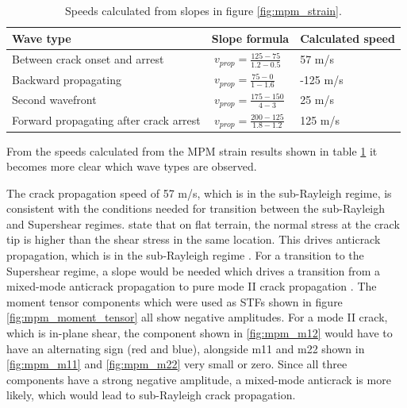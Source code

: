 \begin{table}[H]
\begin{tabular}{|l|l|l|}
\hline
Wave type                              & Slope formula                           & Calculated speed \\ \hline
Between crack onset and arrest         & $\ v_{prop} = \frac{125-75}{1.2-0.5} $  & 57 m/s           \\ \hline
Backward propagating                   & $\ v_{prop} = \frac{75-0}{1-1.6} $      & -125 m/s          \\ \hline
Second wavefront                       & $\ v_{prop} = \frac{175-150}{4-3} $     & 25 m/s           \\ \hline
Forward propagating after crack arrest & $\ v_{prop} = \frac{200-125}{1.8-1.2} $ & 125 m/s          \\ \hline
\end{tabular}
\caption{Speeds calculated from slopes in figure \ref{fig:mpm_strain}.}
\label{tab:mpm_results_speeds}
\end{table}

From the speeds calculated from the MPM strain results shown in table \ref{tab:mpm_results_speeds} it becomes more clear which wave types are observed. \par

The crack propagation speed of 57 m/s, which is in the sub-Rayleigh regime, is consistent with the conditions needed for transition between the sub-Rayleigh and Supershear regimes. \cite{trottetTransitionSubRayleighAnticrack2022} state that on flat terrain, the normal stress at the crack tip is higher than the shear stress in the same location. This drives anticrack propagation, which is in the sub-Rayleigh regime \parencite{gaumeDynamicAnticrackPropagation2018,trottetTransitionSubRayleighAnticrack2022}. For a transition to the Supershear regime, a slope would be needed which drives a transition from a mixed-mode anticrack propagation to pure mode II crack propagation \parencite{trottetTransitionSubRayleighAnticrack2022}. The moment tensor components which were used as STFs shown in figure \ref{fig:mpm_moment_tensor} all show negative amplitudes. For a mode II crack, which is in-plane shear, the component shown in \ref{fig:mpm_m12} would have to have an alternating sign (red and blue), alongside m11 and m22 shown in \ref{fig:mpm_m11} and \ref{fig:mpm_m22} very small or zero. Since all three components have a strong negative amplitude, a mixed-mode anticrack is more likely, which would lead to sub-Rayleigh crack propagation. \par 

